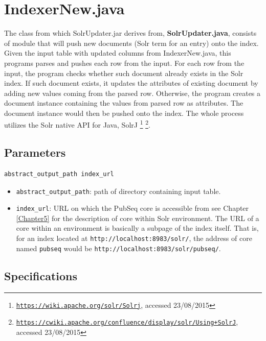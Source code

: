 \section{IndexerNew.java}

The class from which SolrUpdater.jar derives from, \textbf{SolrUpdater.java}, consists of module that will push new documents (Solr term for an entry) onto the index. Given the input table with updated columns from IndexerNew.java, this programs parses and pushes each row from the input. For each row from the input, the program checks whether such document already exists in the Solr index. If such document exists, it updates the attributes of existing document by adding new values coming from the parsed row. Otherwise, the program creates a document instance containing the values from parsed row as attributes. The document instance would then be pushed onto the index. The whole process utilizes the Solr native API for Java, SolrJ \citep{grainger2014solr} \footnote{\href{https://wiki.apache.org/solr/Solrj}{\texttt{https://wiki.apache.org/solr/Solrj}}, accessed 23/08/2015} \footnote{\href{https://cwiki.apache.org/confluence/display/solr/Using+SolrJ}{\texttt{https://cwiki.apache.org/confluence/display/solr/Using+SolrJ}}, accessed 23/08/2015}.

\subsection{Parameters}

\begin{lstlisting}[breaklines]
abstract_output_path index_url
\end{lstlisting}

\begin{itemize}
\item \texttt{abstract\_output\_path}: path of directory containing input table.
\item \texttt{index\_url}: URL on which the PubSeq core is accessible from see Chapter \ref{Chapter5} for the description of core within Solr environment. The URL of a core within an environment is basically a subpage of the index itself. That is, for an index located at \texttt{http://localhost:8983/solr/}, the address of core named \texttt{pubseq} would be \texttt{http://localhost:8983/solr/pubseq/}.
\end{itemize}

\subsection{Specifications}

